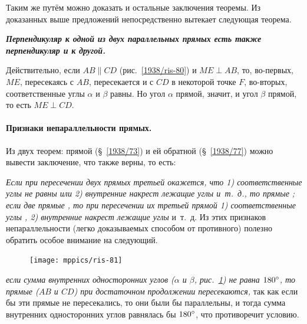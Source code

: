 \documentclass[twoside]{book}
\begin{document}
Таким же путём можно доказать и остальные заключения теоремы.
Из доказанных выше предложений непосредственно вытекает следующая теорема.

\textbf{\emph{Перпендикуляр к одной из двух параллельных прямых есть также перпендикуляр и к другой.}}

Действительно, если $AB\parallel CD$ (рис.~\ref{1938/ris-80}) и $ME\perp AB$, то, во-первых, $ME$, пересекаясь с $AB$, пересекается и с $CD$ в некоторой точке $F$, во-вторых, соответственные углы $\alpha$ и $\beta$ равны.
Но угол $\alpha$ прямой, значит, и угол $\beta$ прямой, то есть
$ME\perp CD$.

\paragraph{Признаки непараллельности прямых.}\label{1938/78}
Из двух теорем:
прямой (§~\ref{1938/73}) и ей обратной (§~\ref{1938/77}) можно вывести заключение, что  также верны, то есть:

\emph{Если при пересечении двух прямых третьей окажется, что 1) соответственные углы не равны или 2) внутренние накрест лежащие углы  и~т.~д., то прямые ;
если две прямые , то при пересечении их третьей прямой 1) соответственные углы , 2) внутренние накрест лежащие углы } и~т.~д.
Из этих признаков непараллельности (легко доказываемых способом от противного) полезно обратить особое внимание на следующий.

\begin{figure}
\vskip-4mm
\centering
\texttt{[image: mppics/ris-81]}
\caption{}\label{1938/ris-81}
\end{figure}

\emph{если сумма внутренних односторонних углов \emph{($\alpha$ и $\beta$, рис.~\ref{1938/ris-81})} не равна $180\degree$, то прямые \emph{($AB$ и $CD$)} при достаточном продолжении пересекаются,} так как если бы эти прямые не пересекались, то они были бы параллельны, и тогда сумма внутренних односторонних углов равнялась бы $180\degree$, что противоречит условию.
\end{document}
